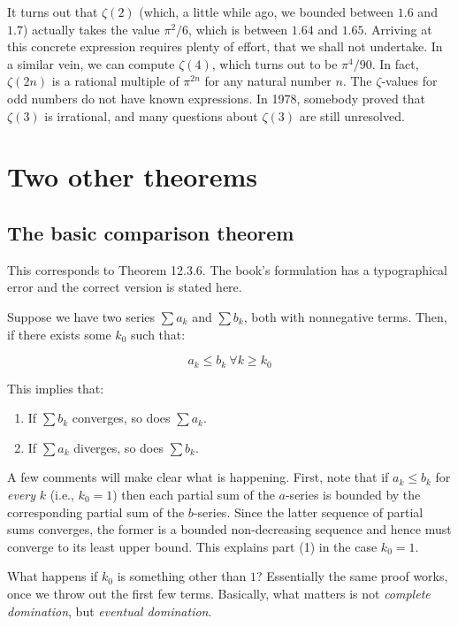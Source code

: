 \documentclass{amsart}
\begin{document}
It turns out that $\zeta(2)$ (which, a little while ago, we bounded
between $1.6$ and $1.7$) actually takes the value $\pi^2/6$, which is
between $1.64$ and $1.65$. Arriving at this concrete expression
requires plenty of effort, that we shall not undertake. In a similar
vein, we can compute $\zeta(4)$, which turns out to be $\pi^4/90$. In
fact, $\zeta(2n)$ is a rational multiple of $\pi^{2n}$ for any natural
number $n$. The $\zeta$-values for odd numbers do not have known
expressions. In 1978, somebody proved that $\zeta(3)$ is irrational,
and many questions about $\zeta(3)$ are still unresolved.


\section{Two other theorems}

\subsection{The basic comparison theorem}

This corresponds to Theorem 12.3.6. The book's formulation has a
typographical error and the correct version is stated here.

Suppose we have two series $\sum a_k$ and $\sum b_k$, both with
nonnegative terms. Then, if there exists some $k_0$ such that:

$$a_k \le b_k \ \forall k \ge k_0$$

This implies that:

\begin{enumerate}
\item If $\sum b_k$ converges, so does $\sum a_k$.
\item If $\sum a_k$ diverges, so does $\sum b_k$.
\end{enumerate}

A few comments will make clear what is happening. First, note that if
$a_k \le b_k$ for {\em every} $k$ (i.e., $k_0 = 1$) then each partial
sum of the $a$-series is bounded by the corresponding partial sum of
the $b$-series. Since the latter sequence of partial sums converges,
the former is a bounded non-decreasing sequence and hence must
converge to its least upper bound. This explains part (1) in the case
$k_0 = 1$.

What happens if $k_0$ is something other than $1$? Essentially the
same proof works, once we throw out the first few terms. Basically,
what matters is not {\em complete domination}, but {\em eventual
domination}.
\end{document}
